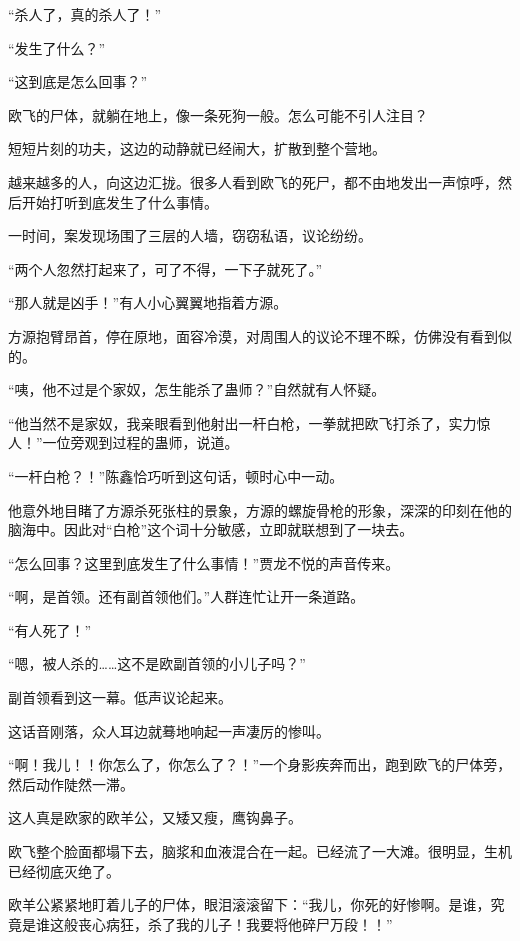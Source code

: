 
\begin{this_body}

“杀人了，真的杀人了！”

“发生了什么？”

“这到底是怎么回事？”

欧飞的尸体，就躺在地上，像一条死狗一般。怎么可能不引人注目？

短短片刻的功夫，这边的动静就已经闹大，扩散到整个营地。

越来越多的人，向这边汇拢。很多人看到欧飞的死尸，都不由地发出一声惊呼，然后开始打听到底发生了什么事情。

一时间，案发现场围了三层的人墙，窃窃私语，议论纷纷。

“两个人忽然打起来了，可了不得，一下子就死了。”

“那人就是凶手！”有人小心翼翼地指着方源。

方源抱臂昂首，停在原地，面容冷漠，对周围人的议论不理不睬，仿佛没有看到似的。

“咦，他不过是个家奴，怎生能杀了蛊师？”自然就有人怀疑。

“他当然不是家奴，我亲眼看到他射出一杆白枪，一拳就把欧飞打杀了，实力惊人！”一位旁观到过程的蛊师，说道。

“一杆白枪？！”陈鑫恰巧听到这句话，顿时心中一动。

他意外地目睹了方源杀死张柱的景象，方源的螺旋骨枪的形象，深深的印刻在他的脑海中。因此对“白枪”这个词十分敏感，立即就联想到了一块去。

“怎么回事？这里到底发生了什么事情！”贾龙不悦的声音传来。

“啊，是首领。还有副首领他们。”人群连忙让开一条道路。

“有人死了！”

“嗯，被人杀的……这不是欧副首领的小儿子吗？”

副首领看到这一幕。低声议论起来。

这话音刚落，众人耳边就蓦地响起一声凄厉的惨叫。

“啊！我儿！！你怎么了，你怎么了？！”一个身影疾奔而出，跑到欧飞的尸体旁，然后动作陡然一滞。

这人真是欧家的欧羊公，又矮又瘦，鹰钩鼻子。

欧飞整个脸面都塌下去，脑浆和血液混合在一起。已经流了一大滩。很明显，生机已经彻底灭绝了。

欧羊公紧紧地盯着儿子的尸体，眼泪滚滚留下：“我儿，你死的好惨啊。是谁，究竟是谁这般丧心病狂，杀了我的儿子！我要将他碎尸万段！！”


\end{this_body}
